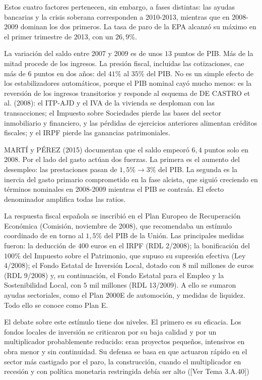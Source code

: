 \documentclass[10pt,a4paper]{article}
\newcommand{\authorfont}[1]{{\fontfamily{EBGaramond-TLF}\selectfont #1}}
\begin{document}
Estos cuatro factores pertenecen, sin embargo, a fases distintas: las ayudas bancarias y la crisis soberana corresponden a 2010-2013, mientras que en 2008-2009 dominan los dos primeros. La tasa de paro de la EPA alcanzó su máximo en el primer trimestre de 2013, con un $26,9\%$.

La variación del saldo entre 2007 y 2009 es de unos $13$ puntos de PIB. Más de la mitad procede de los ingresos. La presión fiscal, incluidas las cotizaciones, cae más de $6$ puntos en dos años: del $41\%$ al $35\%$ del PIB. No es un simple efecto de los estabilizadores automáticos, porque el PIB nominal cayó mucho menos: es la reversión de los ingresos transitorios y responde al esquema de DE CASTRO et al. (2008): el ITP-AJD y el IVA de la vivienda se desploman con las transacciones; el Impuesto sobre Sociedades pierde las bases del sector inmobiliario y financiero, y las pérdidas de ejercicios anteriores alimentan créditos fiscales; y el IRPF pierde las ganancias patrimoniales.

MARTÍ y PÉREZ (2015) documentan que el saldo empeoró $6,4$ puntos solo en 2008. Por el lado del gasto actúan dos fuerzas. La primera es el aumento del desempleo: las prestaciones pasan de $1,5\%\to3\%$ del PIB. La segunda es la inercia del gasto primario comprometido en la fase alcista, que siguió creciendo en términos nominales en 2008-2009 mientras el PIB se contraía. El efecto denominador amplifica todas las ratios.

La respuesta fiscal española se inscribió en el Plan Europeo de Recuperación Económica (Comisión, noviembre de 2008), que recomendaba un estímulo coordinado de en torno al $1,5\%$ del PIB de la Unión. Las principales medidas fueron: la deducción de $400$ euros en el IRPF (RDL 2/2008); la bonificación del $100\%$ del Impuesto sobre el Patrimonio, que supuso su supresión efectiva (Ley 4/2008); el Fondo Estatal de Inversión Local, dotado con $8$ mil millones de euros (RDL 9/2008) y, su continuación, el Fondo Estatal para el Empleo y la Sostenibilidad Local, con $5$ mil millones (RDL 13/2009). A ello se sumaron ayudas sectoriales, como el Plan 2000E de automoción, y medidas de liquidez. Todo ello se conoce como Plan E.

El debate sobre este estímulo tiene dos niveles. El primero es su eficacia. Los fondos locales de inversión se criticaron por su baja calidad y por un multiplicador probablemente reducido: eran proyectos pequeños, intensivos en obra menor y sin continuidad. Su defensa se basa en que actuaron rápido en el sector más castigado por el paro, la construcción, cuando el multiplicador en recesión y con política monetaria restringida debía ser alto ([\authorfont{Ver Tema 3.A.40}])
\end{document}
